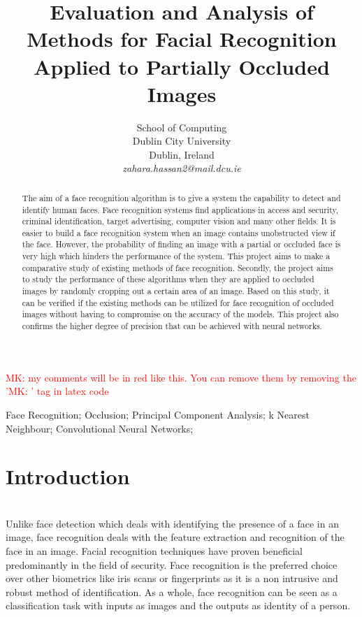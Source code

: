 \documentclass[conference]{IEEEtran}
\newcommand{\MK}[1]{\textcolor{red}{MK: #1}}  %
\begin{document}
\title{Evaluation and Analysis of Methods for Facial Recognition Applied to Partially Occluded Images}

\author{
School of Computing\\
Dublin City University\\
Dublin, Ireland \\
\textit{zahara.hassan2@mail.dcu.ie
}}

\maketitle

\MK{my comments will be in red like this. You can remove them by removing the '\MK' tag in latex code}

\begin{abstract}
The aim of a face recognition algorithm is to give a system the capability to detect and identify human faces. Face recognition systems find applications in access and security, criminal identification, target advertising, computer vision and many other fields. It is easier to build a face recognition system when an image contains unobstructed view if the face. However, the probability of finding an image with a partial or occluded face is very high which hinders the performance of the system. This project aims to make a comparative study of existing methods of face recognition. Secondly, the project aims to study the performance of these algorithms when they are applied to occluded images by randomly cropping out a certain area of an image. Based on this study, it can be verified if the existing methods can be utilized for face recognition of occluded images without having to compromise on the accuracy of the models. This project also confirms the higher degree of precision that can be achieved with neural networks.

\end{abstract}

\begin{IEEEkeywords}
Face Recognition; Occlusion; Principal Component Analysis; k Nearest Neighbour; Convolutional Neural Networks;

\end{IEEEkeywords}

\section{Introduction}
\label{sec: 1.introduction} \\
Unlike face detection which deals with identifying the presence of a face in an image, face recognition deals with the feature extraction and recognition of the face in an image. Facial recognition techniques have proven beneficial predominantly in the field of security. Face recognition is the preferred choice over other biometrics like iris scans or fingerprints as it is a non intrusive and robust method of identification. As a whole, face recognition can be seen as a classification task with inputs as images and the outputs as identity of a person. 
\end{document}

